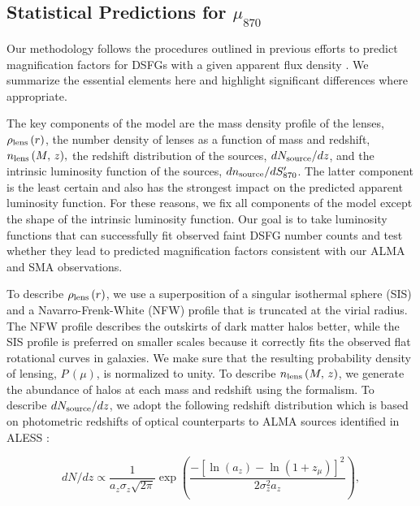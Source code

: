 \documentclass[iop]{emulateapj}
\begin{document}
\subsection{Statistical Predictions for $\mu_{870}$}\label{sec:statpredict}

Our methodology follows the procedures outlined in previous efforts to predict
magnification factors for DSFGs with a given apparent flux density
\citep[chiefly,][]{Lima:2010fk, Wardlow:2013lr, Fialkov:2015eu}.  We summarize
the essential elements here and highlight significant differences where
appropriate.  

The key components of the model are the mass density profile of the lenses,
$\rho_{\rm lens}\,(r)$, the number density of lenses as a function of mass and
redshift, $n_{\rm lens}\,(M, \, z),$ the redshift distribution of the sources,
$dN_{\rm source}/dz$, and the intrinsic luminosity function of the sources,
$dn_{\rm source}/dS_{870}^\prime$.  The latter component is the least certain
and also has the strongest impact on the predicted apparent luminosity
function.  For these reasons, we fix all components of the model except the
shape of the intrinsic luminosity function.  Our goal is to take luminosity
functions that can successfully fit observed faint DSFG number counts
\citep{Karim:2013lr} and test whether they lead to predicted magnification
factors consistent with our ALMA and SMA observations.

To describe $\rho_{\rm lens}\,(r)$, we use a superposition of a singular
isothermal sphere (SIS) and a Navarro-Frenk-White (NFW) profile
\citep{Navarro:1997ys} that is truncated at the virial radius.  The NFW profile
describes the outskirts of dark matter halos better, while the SIS profile is
preferred on smaller scales because it correctly fits the observed flat
rotational curves in galaxies.  We make sure that the resulting probability
density of lensing, $P\,(\mu)$, is normalized to unity.  To describe $n_{\rm
lens}\,(M, \, z)$, we generate the abundance of halos at each mass and redshift
using the \citet{Sheth:1999kx} formalism.  To describe $dN_{\rm source}/dz$, we
adopt the following redshift distribution which is based on photometric
redshifts of optical counterparts to ALMA sources identified in ALESS
\citep{Simpson:2014lr}:

\begin{equation}
    dN/dz \propto \frac{1}{a_z\sigma_z \sqrt{2\pi}}
    \exp\left( \frac{-[\ln(a_z) - \ln(1 + z_\mu)]^2} {2\sigma_z^2 a_z} \right),
\end{equation}
\end{document}
